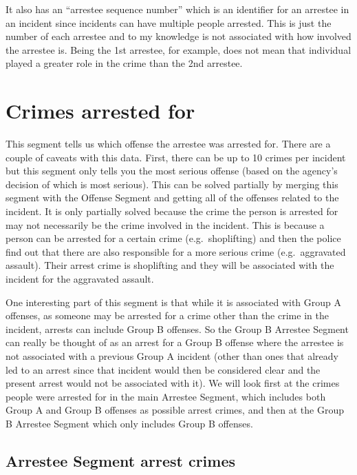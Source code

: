 \documentclass[
]{krantz}
\begin{document}
It also has an ``arrestee sequence number'' which is an
identifier for an arrestee in an incident since incidents
can have multiple people arrested. This is just the number
of each arrestee and to my knowledge is not associated with
how involved the arrestee is. Being the 1st arrestee, for
example, does not mean that individual played a greater role
in the crime than the 2nd arrestee.

\section{Crimes arrested for}\label{crimes-arrested-for}

This segment tells us which offense the arrestee was
arrested for. There are a couple of caveats with this data.
First, there can be up to 10 crimes per incident but this
segment only tells you the most serious offense (based on
the agency's decision of which is most serious). This can be
solved partially by merging this segment with the Offense
Segment and getting all of the offenses related to the
incident. It is only partially solved because the crime the
person is arrested for may not necessarily be the crime
involved in the incident. This is because a person can be
arrested for a certain crime (e.g.~shoplifting) and then the
police find out that there are also responsible for a more
serious crime (e.g.~aggravated assault). Their arrest crime
is shoplifting and they will be associated with the incident
for the aggravated assault.

One interesting part of this segment is that while it is
associated with Group A offenses, as someone may be arrested
for a crime other than the crime in the incident, arrests
can include Group B offenses. So the Group B Arrestee
Segment can really be thought of as an arrest for a Group B
offense where the arrestee is not associated with a previous
Group A incident (other than ones that already led to an
arrest since that incident would then be considered clear
and the present arrest would not be associated with it). We
will look first at the crimes people were arrested for in
the main Arrestee Segment, which includes both Group A and
Group B offenses as possible arrest crimes, and then at the
Group B Arrestee Segment which only includes Group B
offenses.

\subsection{Arrestee Segment arrest
crimes}\label{arrestee-segment-arrest-crimes}
\end{document}
